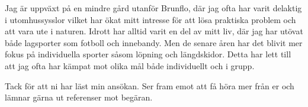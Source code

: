 \documentclass[11pt,a4paper,sans]{moderncv}        %
\begin{document}


Jag är uppväxt på en mindre gård utanför Brunflo, där jag ofta har varit delaktig i utomhussysslor vilket har ökat mitt intresse för att lösa praktiska problem och att vara ute i naturen. Idrott har alltid varit en del av mitt liv, där jag har utövat både lagsporter som fotboll och innebandy. Men de senare åren har det blivit mer fokus på individuella sporter såsom löpning och längdskidor. Detta har lett till att jag ofta har kämpat mot olika mål både individuellt och i grupp.





Tack för att ni har läst min ansökan. Ser fram emot att få höra mer från er och lämnar gärna ut referenser mot begäran.


\makeletterclosing

\end{document}
